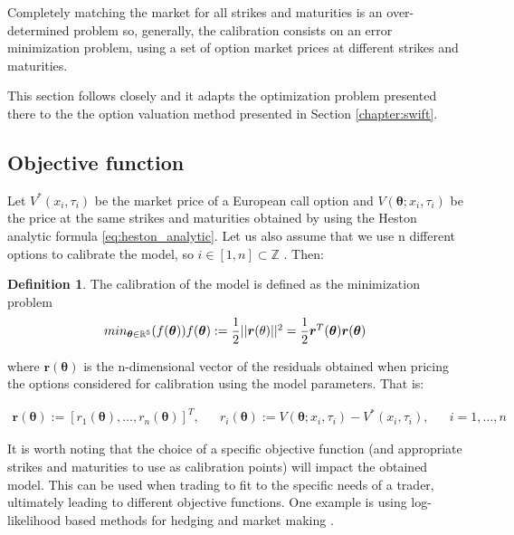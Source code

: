 \documentclass[12,twoside]{mammeTFM}
\theoremstyle{definition}
\newtheorem{definition}[thm]{Definition}
\theoremstyle{remark}
\newcommand{\Z}{\ensuremath{\mathbb{Z}}}
\newcommand{\R}{\ensuremath{\mathbb{R}}}
\begin{document}
Completely matching the market for all strikes and maturities is an over-determined problem so, generally, the calibration consists on an error minimization problem, using a set of option market prices at different strikes and maturities.

This section follows closely \cite{cui17} and it adapts the optimization problem presented there to the the option valuation method presented in Section \ref{chapter:swift}.

\subsection{Objective function}
Let $V^*(x_i, \tau_i)$ be the market price of a European call option and
 $V(\boldsymbol{\theta}; x_i, \tau_i)$ be the price at the same strikes and maturities obtained by using the Heston analytic formula \ref{eq:heston_analytic}. Let us also assume that we use n different options to calibrate the model, so 
 $i \in [1,n] \subset \Z$
 . Then:
\begin{definition} The calibration of the model is defined as the minimization problem 
\begin{equation} \label{eq:opt_problem}
min_{\boldsymbol{\theta} \in \R^5} (f(\boldsymbol{\theta}))$$ $$f(\boldsymbol{\theta}) := \dfrac{1}{2}||\boldsymbol{r}(\theta)||^2 = \dfrac{1}{2} \boldsymbol{r}^T(\boldsymbol{\theta})\boldsymbol{r}(\boldsymbol{\theta})
\end{equation}
\end{definition}
where $\boldsymbol{r}(\boldsymbol{\theta})$ is the n-dimensional vector of the residuals obtained when pricing the options considered for calibration using the model parameters. That is:

\begin{align} \label{eq:opt_problem2}
\boldsymbol{r}(\boldsymbol{\theta}) := \left[r_1(\boldsymbol{\theta}), \ldots, r_n(\boldsymbol{\theta}) \right]^T, 
&& r_i(\boldsymbol{\theta}) :=  V(\boldsymbol{\theta}; x_i, \tau_i) - V^*(x_i, \tau_i), && i = 1, \ldots, n
\end{align}

It is worth noting that the choice of a specific objective function (and appropriate strikes and maturities to use as calibration points) will impact the obtained model. This can be used when trading to fit to the specific needs of a trader, ultimately leading to different objective functions. One example is using log-likelihood based methods for hedging and market making \cite{chr02}. 
\end{document}
